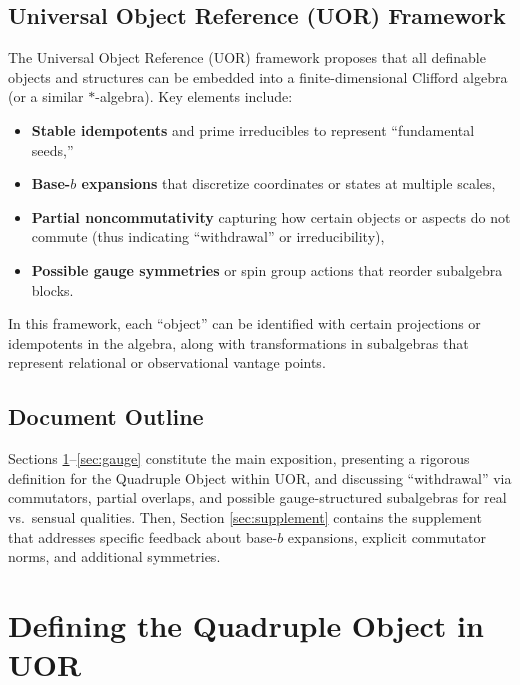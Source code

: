 \documentclass[11pt]{article}
\begin{document}
\subsection{Universal Object Reference (UOR) Framework}
The Universal Object Reference (UOR) framework proposes that all definable objects 
and structures can be embedded into a finite-dimensional Clifford algebra (or a similar 
$*$-algebra). Key elements include:
\begin{itemize}[itemsep=0pt]
\item \textbf{Stable idempotents} and prime irreducibles to represent “fundamental seeds,”
\item \textbf{Base-$b$ expansions} that discretize coordinates or states at multiple scales,
\item \textbf{Partial noncommutativity} capturing how certain objects or aspects 
      do not commute (thus indicating “withdrawal” or irreducibility),
\item \textbf{Possible gauge symmetries} or spin group actions 
      that reorder subalgebra blocks.
\end{itemize}
In this framework, each “object” can be identified with certain projections or 
idempotents in the algebra, along with transformations in subalgebras that represent 
relational or observational vantage points.

\subsection{Document Outline}
Sections \ref{sec:quadObj}–\ref{sec:gauge} constitute the main exposition, 
presenting a rigorous definition for the Quadruple Object within UOR, 
and discussing “withdrawal” via commutators, partial overlaps, 
and possible gauge-structured subalgebras for real vs.\ sensual qualities. 
Then, Section \ref{sec:supplement} contains the supplement that addresses 
specific feedback about base-$b$ expansions, explicit commutator norms, 
and additional symmetries.


\section{Defining the Quadruple Object in UOR}
\label{sec:quadObj}
\end{document}
